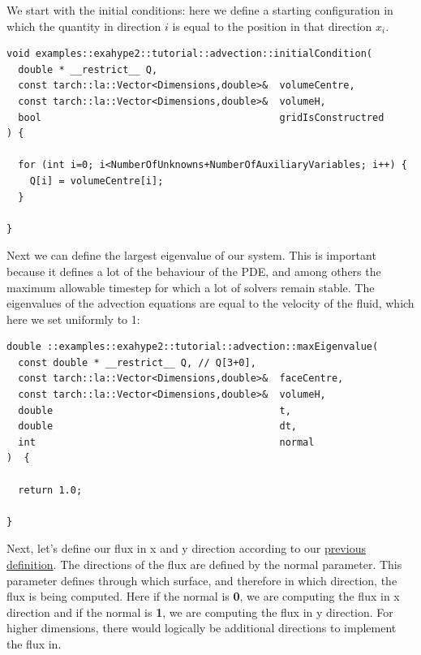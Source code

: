 \documentclass[12pt,letterpaper]{article}
\begin{document}
We start with the initial conditions: here we define a starting configuration in which the quantity in direction $i$ is equal to the position in that direction $x_i$.\\

\begin{lstlisting}[style = C++]
void examples::exahype2::tutorial::advection::initialCondition(
  double * __restrict__ Q,
  const tarch::la::Vector<Dimensions,double>&  volumeCentre,
  const tarch::la::Vector<Dimensions,double>&  volumeH,
  bool                                         gridIsConstructred
) {

  for (int i=0; i<NumberOfUnknowns+NumberOfAuxiliaryVariables; i++) {
    Q[i] = volumeCentre[i];
  }

}
\end{lstlisting}

\newpage


Next we can define the largest eigenvalue of our system. This is important because it defines a lot of the behaviour of the PDE, and among others the maximum allowable timestep for which a lot of solvers remain stable. The eigenvalues of the advection equations are equal to the velocity of the fluid, which here we set uniformly to 1:

\vspace{1cm}

\begin{lstlisting}[style = C++]
double ::examples::exahype2::tutorial::advection::maxEigenvalue(
  const double * __restrict__ Q, // Q[3+0],
  const tarch::la::Vector<Dimensions,double>&  faceCentre,
  const tarch::la::Vector<Dimensions,double>&  volumeH,
  double                                       t,
  double                                       dt,
  int                                          normal
)  {

  return 1.0;

}
\end{lstlisting}

\vspace{1cm}


Next, let's define our flux in x and y direction according to our \hyperref[Advection_equation]{previous definition}.
The directions of the flux are defined by the normal parameter. This parameter defines through which surface, and therefore in which direction, the flux is being computed. Here if the normal is \textbf{0}, we are computing the flux in x direction and if the normal is \textbf{1}, we are computing the flux in y direction. For higher dimensions, there would logically be additional directions to implement the flux in.
\end{document}
